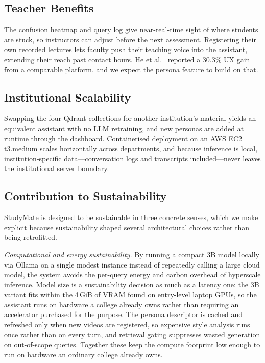 \documentclass[conference]{IEEEtran}
\begin{document}
\subsection{Teacher Benefits}
The confusion heatmap and query log give near-real-time sight of where
students are stuck, so instructors can adjust before the next
assessment. Registering their own recorded lectures lets faculty push
their teaching voice into the assistant, extending their reach past
contact hours. He et al.~\cite{he2025} reported a 30.3\% UX gain from a
comparable platform, and we expect the persona feature to build on that.
\subsection{Institutional Scalability}
Swapping the four Qdrant collections for another institution's material
yields an equivalent assistant with no LLM retraining, and new personas
are added at runtime through the dashboard. Containerised deployment on
an AWS EC2 t3.medium scales horizontally across departments, and because
inference is local, institution-specific data---conversation logs and
transcripts included---never leaves the institutional server boundary.

\subsection{Contribution to Sustainability}
StudyMate is designed to be sustainable in three concrete senses, which
we make explicit because sustainability shaped several architectural
choices rather than being retrofitted.

\textit{Computational and energy sustainability.} By running a compact
3B model locally via Ollama on a single modest instance instead of
repeatedly calling a large cloud model, the system avoids the
per-query energy and carbon overhead of hyperscale inference. Model
size is a sustainability decision as much as a latency one: the 3B
variant fits within the 4\,GiB of VRAM found on entry-level laptop
GPUs, so the assistant runs on hardware a college already owns rather
than requiring an accelerator purchased for the purpose. The
persona descriptor is cached and refreshed only when new videos are
registered, so expensive style analysis runs once rather than on every
turn, and retrieval gating suppresses wasted generation on
out-of-scope queries. Together these keep the compute footprint low
enough to run on hardware an ordinary college already owns.
\end{document}
